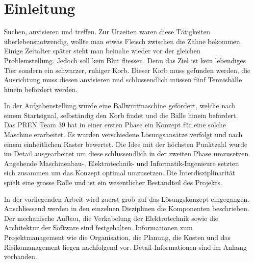 \section{Einleitung}

Suchen, anvisieren und treffen. Zur Urzeiten waren diese Tätigkeiten überlebensnotwendig, wollte man etwas Fleisch zwischen die Zähne bekommen. Einige Zeitalter später steht man beinahe wieder vor der gleichen Problemstellung. Jedoch soll kein Blut fliessen. Denn das Ziel ist kein lebendiges Tier sondern ein schwarzer, ruhiger Korb. Dieser Korb muss gefunden werden, die Ausrichtung muss diesen anvisieren und schlussendlich müssen fünf Tennisbälle hinein befördert werden.

In der Aufgabenstellung wurde eine Ballwurfmaschine gefordert, welche nach einem Startsignal, selbständig den Korb findet und die Bälle hinein befördert. Das PREN Team 39 hat in einer ersten Phase ein Konzept für eine solche Maschine erarbeitet. Es wurden verschiedene Lösungsansätze verfolgt und nach einem einheitlichen Raster bewertet. Die Idee mit der höchsten Punktzahl wurde im Detail ausgearbeitet um diese schlussendlich in der zweiten Phase umzusetzen. Angehende Maschinenbau-, Elektrotechnik- und Informatik-Ingenieure setzten sich zusammen um das Konzept optimal umzusetzen. Die Interdisziplinarität spielt eine grosse Rolle und ist ein wesentlicher Bestandteil des Projekts.

In der vorliegenden Arbeit wird zuerst grob auf das Lösungskonzept eingegangen. Anschliessend werden in den einzelnen Disziplinen die Komponenten beschrieben. Der mechanische Aufbau, die Verkabelung der Elektrotechnik sowie die Architektur der Software sind festgehalten. Informationen zum Projektmanagement wie die Organisation, die Planung, die Kosten und das Risikomanagement liegen nachfolgend vor. Detail-Informationen sind im Anhang vorhanden.


